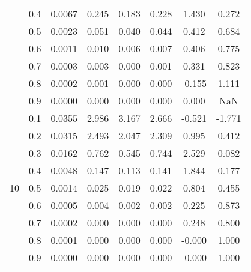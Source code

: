 \documentclass[11pt,a4paper]{report}
\begin{document}
\begin{longtable}{ | c | c || c | c | c | c | c | c | }
 & 0.4 & 0.0067 & 0.245 & 0.183 & 0.228 & 1.430 & 0.272 \\
 & 0.5 & 0.0023 & 0.051 & 0.040 & 0.044 & 0.412 & 0.684 \\
 & 0.6 & 0.0011 & 0.010 & 0.006 & 0.007 & 0.406 & 0.775 \\
 & 0.7 & 0.0003 & 0.003 & 0.000 & 0.001 & 0.331 & 0.823 \\
 & 0.8 & 0.0002 & 0.001 & 0.000 & 0.000 & -0.155 & 1.111 \\
 & 0.9 & 0.0000 & 0.000 & 0.000 & 0.000 & 0.000 & NaN \\
 \hline
\multirow{9}{*}{10} & 0.1 & 0.0355 & 2.986 & 3.167 & 2.666 & -0.521 & -1.771 \\
 & 0.2 & 0.0315 & 2.493 & 2.047 & 2.309 & 0.995 & 0.412 \\
 & 0.3 & 0.0162 & 0.762 & 0.545 & 0.744 & 2.529 & 0.082 \\
 & 0.4 & 0.0048 & 0.147 & 0.113 & 0.141 & 1.844 & 0.177 \\
 & 0.5 & 0.0014 & 0.025 & 0.019 & 0.022 & 0.804 & 0.455 \\
 & 0.6 & 0.0005 & 0.004 & 0.002 & 0.002 & 0.225 & 0.873 \\
 & 0.7 & 0.0002 & 0.000 & 0.000 & 0.000 & 0.248 & 0.800 \\
 & 0.8 & 0.0001 & 0.000 & 0.000 & 0.000 & -0.000 & 1.000 \\
 & 0.9 & 0.0000 & 0.000 & 0.000 & 0.000 & -0.000 & 1.000 \\
 \hline
\hline
\end{longtable}
\end{document}
